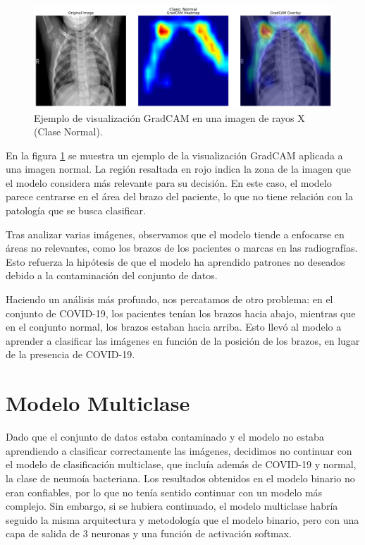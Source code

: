\documentclass[es]{uc3mreport}
\begin{document}
\begin{report}
    \begin{figure}[H]
        \centering
        \includegraphics[width=1\textwidth]{NORMAL2-IM-0932-0001_gradcam.png}
        \caption{Ejemplo de visualización GradCAM en una imagen de rayos X (Clase Normal).}
        \label{fig:gradcam}
    \end{figure}
    En la figura \ref{fig:gradcam} se muestra un ejemplo de la visualización GradCAM aplicada a una imagen normal. La región resaltada en rojo indica la zona de la imagen que el modelo considera más relevante para su decisión. En este caso, el modelo parece centrarse en el área del brazo del paciente, lo que no tiene relación con la patología que se busca clasificar.

    Tras analizar varias imágenes, observamos que el modelo tiende a enfocarse en áreas no relevantes, como los brazos de los pacientes o marcas en las radiografías. Esto refuerza la hipótesis de que el modelo ha aprendido patrones no deseados debido a la contaminación del conjunto de datos.

    Haciendo un análisis más profundo, nos percatamos de otro problema: en el conjunto de COVID-19, los pacientes tenían los brazos hacia abajo, mientras que en el conjunto normal, los brazos estaban hacia arriba. Esto llevó al modelo a aprender a clasificar las imágenes en función de la posición de los brazos, en lugar de la presencia de COVID-19.

    \section{Modelo Multiclase}
    Dado que el conjunto de datos estaba contaminado y el modelo no estaba aprendiendo a clasificar correctamente las imágenes, decidimos no continuar con el modelo de clasificación multiclase, que incluía además de COVID-19 y normal, la clase de neumoía bacteriana. Los resultados obtenidos en el modelo binario no eran confiables, por lo que no tenía sentido continuar con un modelo más complejo. Sin embargo, si se hubiera continuado, el modelo multiclase habría seguido la misma arquitectura y metodología que el modelo binario, pero con una capa de salida de 3 neuronas y una función de activación softmax.


\end{report}
\end{document}
